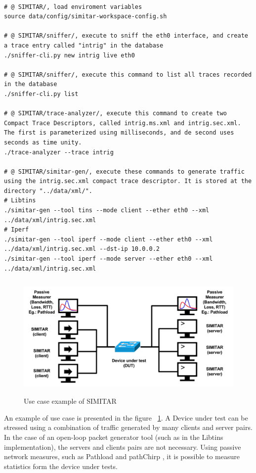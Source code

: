 \begin{verbatim}

# @ SIMITAR/, load enviroment variables
source data/config/simitar-workspace-config.sh

# @ SIMITAR/sniffer/, execute to sniff the eth0 interface, and create a trace entry called "intrig" in the database
./sniffer-cli.py new intrig live eth0

# @ SIMITAR/sniffer/, execute this command to list all traces recorded in the database
./sniffer-cli.py list

# @ SIMITAR/trace-analyzer/, execute this command to create two Compact Trace Descriptors, called intrig.ms.xml and intrig.sec.xml. The first is parameterized using milliseconds, and de second uses seconds as time unity.
./trace-analyzer --trace intrig

# @ SIMITAR/simitar-gen/, execute these commands to generate traffic using the intrig.sec.xml compact trace descriptor. It is stored at the directory "../data/xml/". 
# Libtins
./simitar-gen --tool tins --mode client --ether eth0 --xml ../data/xml/intrig.sec.xml 
# Iperf
./simitar-gen --tool iperf --mode client --ether eth0 --xml ../data/xml/intrig.sec.xml --dst-ip 10.0.0.2
./simitar-gen --tool iperf --mode server --ether eth0 --xml ../data/xml/intrig.sec.xml

\end{verbatim}


\begin{figure}[ht!]
    \centering
    \includegraphics[height=2.4in]{figures/ch3/use-case}
    \caption{Use case example of SIMITAR}
    \label{fig:use-case}
\end{figure}


An example of use case is presented in the figure ~\ref{fig:use-case}. A Device under test can be stressed using a combination of traffic generated by many clients and server pairs. In the case of an open-loop packet generator tool (such as in the Libtins implementation), the servers and clients pairs are not necessary. Using passive network measures, such as Pathload and pathChirp \cite{swing-paper}, it is possible to measure statistics form the device under tests. 



